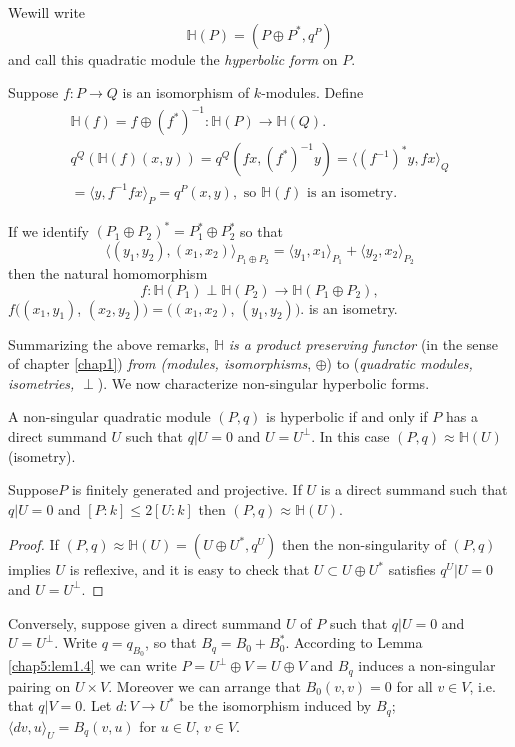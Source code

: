We\pageoriginale will write
$$
\mathbb{H} (P) = (P \oplus P^\ast, q^P)
$$
and call this quadratic module the \textit{hyperbolic form} on $P$.

Suppose $f: P \to Q$ is an isomorphism of $k$-modules. Define 
\begin{gather*}
\mathbb{H}(f)  = f \oplus (f^\ast)^{-1} : \mathbb{H} (P) \to
\mathbb{H} (Q). \\ 
q^Q (\mathbb{H} (f) (x, y)) = q^Q (fx, (f^\ast)^{-1} y) = \langle
(f^{-1})^\ast y, fx \rangle_Q \\ 
= \langle y, f^{-1} fx \rangle_P = q^P (x, y), \text{ so }
\mathbb{H}(f) \text{ is an isometry}. 
\end{gather*}

If we identify $(P_1 \oplus P_2)^\ast = P^\ast_1 \oplus P^\ast_2$ so
that  
$$
\langle (y_1, y_2), (x_1, x_2) \rangle_{P_1 \oplus P_2} = \langle
y_1, x_1 \rangle_{P_1} + \langle y_2, x_2 \rangle_{P_2} 
$$
then the natural homomorphism
$$
f : \mathbb{H} (P_1) \perp \mathbb{H} (P_2) \to \mathbb{H} (P_1 \oplus 
P_2), 
$$
$f((x_1, y_1)$, $(x_2, y_2)) = ((x_1, x_2)$, $(y_1, y_2))$. is an
isometry. 

Summarizing the above remarks, $\mathbb{H}$ \textit{is a product
  preserving func\-tor} (in the sense of chapter \ref{chap1}) \textit{from
  (modules, isomorphisms}, $\oplus$) to (\textit{quadra\-tic modules,
  isometries,} $\perp$). We now characterize non-singular hyperbolic
forms. 

\begin{lemma}\label{chap5:lem2.1}%
A non-singular quadratic module $(P, q)$ is hyperbolic if and only if
$P$ has a direct summand $U$ such that $q|U =0$ and $U = U^\perp$. In
this case $(P, q) \approx \mathbb{H}(U)$ (isometry). 

Suppose\pageoriginale $P$ is finitely generated and projective. 
If $U$ is a direct summand such that $q|U =0$ and $[P : k] \leq 2 [ U:
  k]$ then $(P, q) \approx \mathbb{H}(U)$. 
\end{lemma}

\begin{proof}%
If $(P, q) \approx \mathbb{H}(U) = (U \oplus U^\ast, q^U)$ then the
non-singularity of $(P, q)$ implies $U$ is reflexive, and it is easy
to check that $U \subset U \oplus U^\ast$ satisfies $q^U |U =0$ and $U =
U^\perp$. 
\end{proof}

Conversely, suppose given a direct summand $U$ of $P$ such that $q|U
=0$ and $U = U^\perp$. Write $q=q_{B_0}$, so that $B_q = B_0 +
B^\ast_0$. According to Lemma \ref{chap5:lem1.4} we can write $P =
U^\perp \oplus V = U 
\oplus V$ and $B_q$ induces a non-singular pairing on $U \times
V$. Moreover we can arrange that $B_0 (v, v) =0$ for all $v \in V$,
i.e. that $q|V =0$. Let $d: V \to U^*$ be the isomorphism induced by
$B_q$; $\langle dv, u  \rangle_U = B_q (v, u)$ for $u \in U$, $v \in
V$. 

